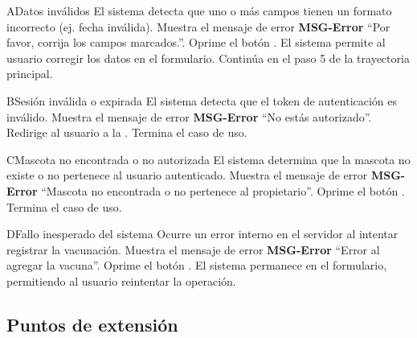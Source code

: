   \begin{UCtrayectoriaA}{A}{Datos inválidos}
      \UCpaso El sistema detecta que uno o más campos tienen un formato incorrecto (ej. fecha inválida).
      \UCpaso Muestra el mensaje de error {\bf MSG-Error} ``Por favor, corrija los campos marcados.''.
      \UCpaso[\UCactor] Oprime el botón .
      \UCpaso[] El sistema permite al usuario corregir los datos en el formulario.
      \UCpaso Continúa en el paso 5 de la trayectoria principal.
  \end{UCtrayectoriaA}
  
  \begin{UCtrayectoriaA}{B}{Sesión inválida o expirada}
      \UCpaso El sistema detecta que el token de autenticación es inválido.
      \UCpaso Muestra el mensaje de error {\bf MSG-Error} ``No estás autorizado''.
      \UCpaso[] Redirige al usuario a la .
      \UCpaso[] Termina el caso de uso.
  \end{UCtrayectoriaA}
  
  \begin{UCtrayectoriaA}{C}{Mascota no encontrada o no autorizada}
       El sistema determina que la mascota no existe o no pertenece al usuario autenticado.
      \UCpaso Muestra el mensaje de error {\bf MSG-Error} ``Mascota no encontrada o no pertenece al propietario''.
      \UCpaso[\UCactor] Oprime el botón .
      \UCpaso[] Termina el caso de uso.
  \end{UCtrayectoriaA}
  
  \begin{UCtrayectoriaA}{D}{Fallo inesperado del sistema}
       Ocurre un error interno en el servidor al intentar registrar la vacunación.
      \UCpaso Muestra el mensaje de error {\bf MSG-Error} ``Error al agregar la vacuna''.
      \UCpaso[\UCactor] Oprime el botón .
      \UCpaso[] El sistema permanece en el formulario, permitiendo al usuario reintentar la operación.
  \end{UCtrayectoriaA}
  
  \subsection{Puntos de extensión}

